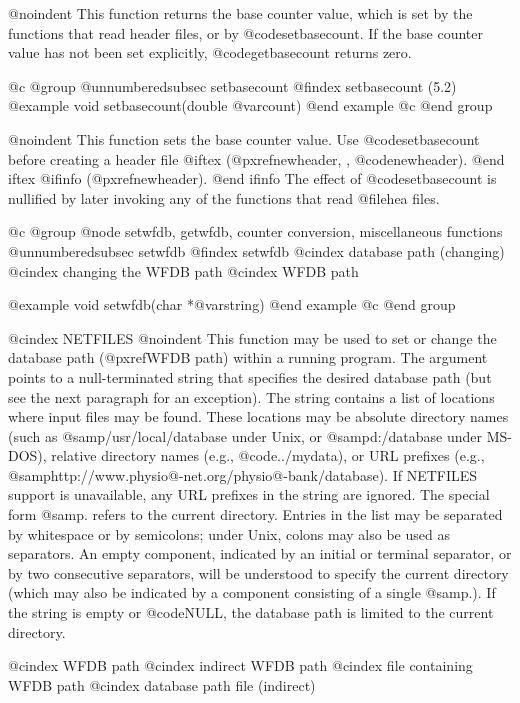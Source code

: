 {{{{{{{{{@noindent
This function returns the base counter value, which is set by the
functions that read header files, or by @code{setbasecount}.
If the base counter value has not been set explicitly,
@code{getbasecount} returns zero.

@c @group
@unnumberedsubsec setbasecount
@findex setbasecount (5.2)
@example
void setbasecount(double @var{count})
@end example
@c @end group

@noindent
This function sets the base counter value.  Use @code{setbasecount}
before creating a header file
@iftex
(@pxref{newheader, , @code{newheader}}).
@end iftex
@ifinfo
(@pxref{newheader}).
@end ifinfo
The effect of @code{setbasecount} is nullified by later invoking any of the
functions that read @file{hea} files.

@c @group
@node     setwfdb, getwfdb, counter conversion, miscellaneous functions
@unnumberedsubsec setwfdb
@findex setwfdb
@cindex database path (changing)
@cindex changing the WFDB path
@cindex WFDB path

@example
void setwfdb(char *@var{string})
@end example
@c @end group

@cindex NETFILES
@noindent
This function may be used to set or change the database path
(@pxref{WFDB path}) within a running program.  The argument points to a
null-terminated string that specifies the desired database path (but see
the next paragraph for an exception).  The string contains a list of
locations where input files may be found.  These locations may be
absolute directory names (such as @samp{/usr/local/database} under Unix,
or @samp{d:/database} under MS-DOS), relative directory names (e.g.,
@code{../mydata}), or URL prefixes (e.g.,
@samp{http://www.physio@-net.org/physio@-bank/database}).  If NETFILES
support is unavailable, any URL prefixes in the string are ignored.  The
special form @samp{.} refers to the current directory.  Entries in the
list may be separated by whitespace or by semicolons; under Unix, colons
may also be used as separators.  An empty component, indicated by an
initial or terminal separator, or by two consecutive separators, will be
understood to specify the current directory (which may also be indicated
by a component consisting of a single @samp{.}).  If the string is empty or
@code{NULL}, the database path is limited to the current directory.

@cindex WFDB path
@cindex indirect WFDB path
@cindex file containing WFDB path
@cindex database path file (indirect)

}}}}}}}}}
